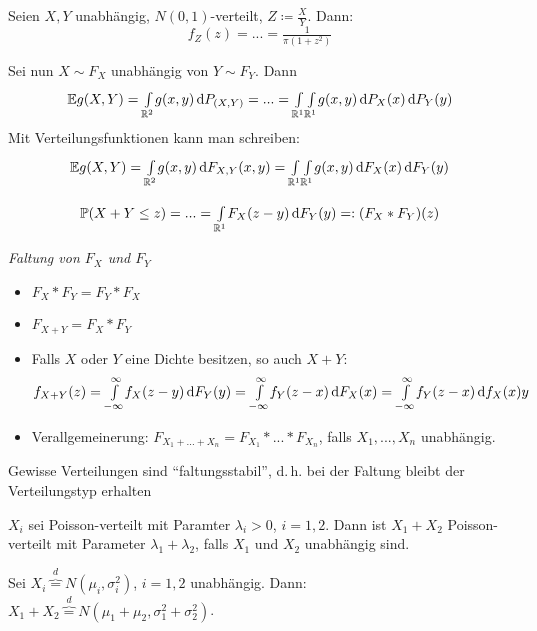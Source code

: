 \documentclass{cheat-sheet}
\renewcommand{\P}{\mathbb{P}} %
\newcommand{\E}{\mathbb{E}} %
\begin{document}
\begin{bsp}
  Seien $X, Y$ unabhängig, $N(0,1)$-verteilt, $Z \coloneqq \tfrac{X}{Y}$. Dann:
  \[ f_Z(z) = ... = \tfrac{1}{\pi (1 + z^2)} \] %
\end{bsp}

\begin{bsp}
  Sei nun $X \sim F_X$ unabhängig von $Y \sim F_Y$. Dann
  \[ \E g(X, Y) = \Int{\R^2}{}{g(x,y)}{P_{(X, Y)}} = ... = \Int{\R^1}{}{\Int{\R^1}{}{g(x,y)}{P_X(x)}}{P_Y(y)} \]
  Mit Verteilungsfunktionen kann man schreiben:
  \[ \E g(X, Y) = \Int{\R^2}{}{g(x, y)}{F_{X, Y}(x, y)} = \Int{\R^1}{}{\Int{\R^1}{}{g(x, y)}{F_X(x)}}{F_Y(y)} \]
\end{bsp}


\[ \P(X + Y \leq z) = ... = \Int{\R^1}{}{F_X(z-y)}{F_Y(y)} =: (F_X * F_Y)(z) \]

\emph{Faltung von $F_X$ und $F_Y$}

\begin{bem}
  \begin{itemize}
    \item $F_X * F_Y = F_Y * F_X$
    \item $F_{X + Y} = F_X * F_Y$
    \item Falls $X$ oder $Y$ eine Dichte besitzen, so auch $X + Y$:
    \[ f_{X+Y}(z) = {\textstyle \int\limits_{-\infty}^{\infty}} f_X(z-y) \,\mathrm{d} F_Y(y) = {\textstyle \int\limits_{-\infty}^{\infty}} f_Y(z-x) \,\mathrm{d} F_X(x) = {\textstyle \int\limits_{-\infty}^{\infty}} f_Y(z-x) \,\mathrm{d} f_X(x){y} \]
    \item Verallgemeinerung: $F_{X_1 + ... + X_n} = F_{X_1} * ... * F_{X_n}$, falls $X_1, ..., X_n$ unabhängig.
  \end{itemize}
\end{bem}

Gewisse Verteilungen sind "`faltungsstabil"', d.\,h. bei der Faltung bleibt der Verteilungstyp erhalten

\begin{bsp}
  $X_i$ sei Poisson-verteilt mit Paramter $\lambda_i > 0$, $i = 1, 2$. Dann ist $X_1 + X_2$ Poisson-verteilt mit Parameter $\lambda_1 + \lambda_2$, falls $X_1$ und $X_2$ unabhängig sind.
\end{bsp}

\begin{bsp}
  Sei $X_i \overbrace{=}^{d} N(\mu_i, \sigma_i^2)$, $i = 1,2$ unabhängig. Dann: $X_1 + X_2 \overbrace{=}^{d} N(\mu_1 + \mu_2, \sigma_1^2 + \sigma_2^2)$.
\end{bsp}
\end{document}
